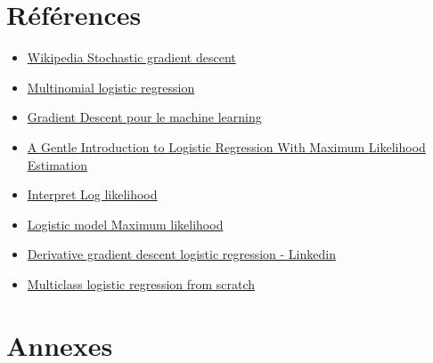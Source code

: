 \documentclass{rapport}
\begin{document}


\section*{Références}


\begin{itemize}
  \item \href{https://en.wikipedia.org/wiki/Stochastic_gradient_descent#Sign-based_stochastic_gradient_descent}{Wikipedia Stochastic gradient descent}
  \item \href{https://en.wikipedia.org/wiki/Multinomial_logistic_regression}{Multinomial logistic regression}
  \item \href{https://eric.univ-lyon2.fr/ricco/cours/slides/gradient_descent.pdf}{Gradient Descent pour le machine learning}

  \item \href{https://machinelearningmastery.com/logistic-regression-with-maximum-likelihood-estimation/}{A Gentle Introduction to Logistic Regression With Maximum Likelihood Estimation}
  
  \item \href{https://www.statology.org/interpret-log-likelihood/#:~:text=The%20log%2Dlikelihood%20value%20of,negative%20infinity%20to%20positive%20infinity.}{Interpret Log likelihood}

  \item \href{https://www.statlect.com/fundamentals-of-statistics/logistic-model-maximum-likelihood}{Logistic model Maximum likelihood}

  \item \href{https://www.linkedin.com/pulse/derivative-gradient-descent-linear-logistic-regression-a-nayem/}{Derivative gradient descent logistic regression - Linkedin}

  \item \href{https://towardsdatascience.com/multiclass-logistic-regression-from-scratch-9cc0007da372}{Multiclass logistic regression from scratch}
  
\end{itemize}


\section*{Annexes}
\end{document}
